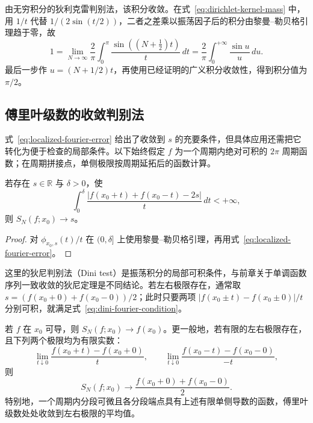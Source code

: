 \begin{solve}
由无穷积分的狄利克雷判别法，该积分收敛。在式~\eqref{eq:dirichlet-kernel-mass} 中，用 $1/t$ 代替 $1/(2\sin(t/2))$，二者之差乘以振荡因子后的积分由黎曼--勒贝格引理趋于零，故
\[
    1=\lim_{N\to\infty}\frac2\pi\int_0^\pi
                  \frac{\sin((N+\tfrac12)t)}t\,dt
      =\frac2\pi\int_0^{+\infty}\frac{\sin u}{u}\,du.
\]
最后一步作 $u=(N+1/2)t$，再使用已经证明的广义积分收敛性，得到积分值为 $\pi/2$。
\end{solve}

\subsection{傅里叶级数的收敛判别法}
\label{subsec:convergence-tests-for-fourier-series}

式~\eqref{eq:localized-fourier-error} 给出了收敛到 $s$ 的充要条件，但具体应用还需把它转化为便于检查的局部条件。以下始终假定 $f$ 为一个周期内绝对可积的 $2\pi$ 周期函数；在周期拼接点，单侧极限按周期延拓后的函数计算。

\begin{theorem}[傅里叶级数的狄尼判别法]
\label{thm:dini-fourier-convergence}
若存在 $s\in\mathbb R$ 与 $\delta>0$，使
\begin{equation}
    \int_0^\delta
       \frac{|f(x_0+t)+f(x_0-t)-2s|}{t}\,dt<+\infty,
    \label{eq:dini-fourier-condition}
\end{equation}
则 $S_N(f;x_0)\to s$。
\end{theorem}

\begin{proof}
对 $\phi_{x_0,s}(t)/t$ 在 $(0,\delta]$ 上使用黎曼--勒贝格引理，再用式~\eqref{eq:localized-fourier-error}。
\end{proof}

这里的狄尼判别法（Dini test）是振荡积分的局部可积条件，与前章关于单调函数序列一致收敛的狄尼定理是不同结论。若左右极限存在，通常取 $s=(f(x_0+0)+f(x_0-0))/2$；此时只要两项 $|f(x_0\pm t)-f(x_0\pm0)|/t$ 分别可积，就满足式~\eqref{eq:dini-fourier-condition}。

\begin{corollary}[可导情形与分段可微情形]
\label{cor:piecewise-differentiable-fourier-convergence}
若 $f$ 在 $x_0$ 可导，则 $S_N(f;x_0)\to f(x_0)$。更一般地，若有限的左右极限存在，且下列两个极限均为有限实数：
\[
    \lim_{t\downarrow0}\frac{f(x_0+t)-f(x_0+0)}t,
    \qquad
    \lim_{t\downarrow0}\frac{f(x_0-t)-f(x_0-0)}{-t},
\]
则
\begin{equation}
    S_N(f;x_0)\longrightarrow
          \frac{f(x_0+0)+f(x_0-0)}2.
    \label{eq:fourier-midpoint-limit}
\end{equation}
特别地，一个周期内分段可微且各分段端点具有上述有限单侧导数的函数，傅里叶级数处处收敛到左右极限的平均值。
\end{corollary}


